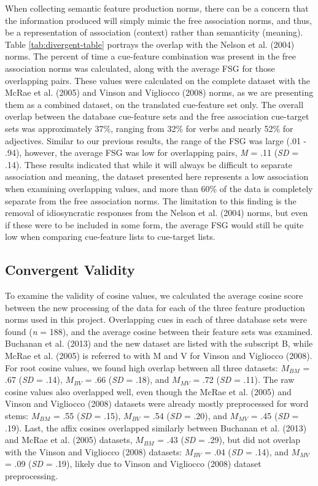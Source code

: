 \documentclass[english,,man]{apa6}
\theoremstyle{definition}
\theoremstyle{definition}
\theoremstyle{definition}
\theoremstyle{remark}
\begin{document}
When collecting semantic feature production norms, there can be a
concern that the information produced will simply mimic the free
association norms, and thus, be a representation of association
(context) rather than semanticity (meaning). Table
\ref{tab:divergent-table} portrays the overlap with the Nelson et al.
(2004) norms. The percent of time a cue-feature combination was present
in the free association norms was calculated, along with the average FSG
for those overlapping pairs. These values were calculated on the
complete dataset with the McRae et al. (2005) and Vinson and Vigliocco
(2008) norms, as we are presenting them as a combined dataset, on the
translated cue-feature set only. The overall overlap between the
database cue-feature sets and the free association cue-target sets was
approximately 37\%, ranging from 32\% for verbs and nearly 52\% for
adjectives. Similar to our previous results, the range of the FSG was
large (.01 - .94), however, the average FSG was low for overlapping
pairs, \emph{M} = .11 (\emph{SD} = .14). These results indicated that
while it will always be difficult to separate association and meaning,
the dataset presented here represents a low association when examining
overlapping values, and more than 60\% of the data is completely
separate from the free association norms. The limitation to this finding
is the removal of idiosyncratic responses from the Nelson et al. (2004)
norms, but even if these were to be included in some form, the average
FSG would still be quite low when comparing cue-feature lists to
cue-target lists.

\hypertarget{convergent-validity}{%
\subsection{Convergent Validity}\label{convergent-validity}}

To examine the validity of cosine values, we calculated the average
cosine score between the new processing of the data for each of the
three feature production norms used in this project. Overlapping cues in
each of three database sets were found (\emph{n} = 188), and the average
cosine between their feature sets was examined. Buchanan et al. (2013)
and the new dataset are listed with the subscript B, while McRae et al.
(2005) is referred to with M and V for Vinson and Vigliocco (2008). For
root cosine values, we found high overlap between all three datasets:
\(M_{BM}\) = .67 (\emph{SD} = .14), \(M_{BV}\) = .66 (\emph{SD} = .18),
and \(M_{MV}\) = .72 (\emph{SD} = .11). The raw cosine values also
overlapped well, even though the McRae et al. (2005) and Vinson and
Vigliocco (2008) datasets were already mostly preprocessed for word
stems: \(M_{BM}\) = .55 (\emph{SD} = .15), \(M_{BV}\) = .54 (\emph{SD} =
.20), and \(M_{MV}\) = .45 (\emph{SD} = .19). Last, the affix cosines
overlapped similarly between Buchanan et al. (2013) and McRae et al.
(2005) datasets, \(M_{BM}\) = .43 (\emph{SD} = .29), but did not overlap
with the Vinson and Vigliocco (2008) datasets: \(M_{BV}\) = .04
(\emph{SD} = .14), and \(M_{MV}\) = .09 (\emph{SD} = .19), likely due to
Vinson and Vigliocco (2008) dataset preprocessing.
\end{document}
